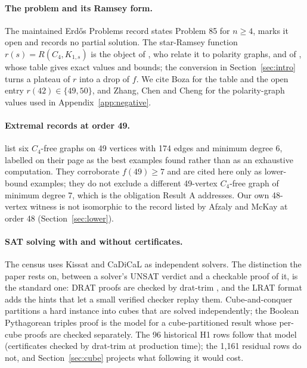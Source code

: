 \documentclass{anvil-paper}
\theoremstyle{definition}
\begin{document}
\paragraph{The problem and its Ramsey form.} The maintained Erdős Problems record \citep{bloom-erdos85} states Problem 85 for $n\ge 4$, marks it open and records no partial solution. The star-Ramsey function $r(s)=R(C_4,K_{1,s})$ is the object of \citet{zhang2017polarity}, who relate it to polarity graphs, and of \citet{boza2024ramsey}, whose table gives exact values and bounds; the conversion in Section~\ref{sec:intro} turns a plateau of $r$ into a drop of $f$. We cite Boza for the table and the open entry $r(42)\in\{49,50\}$, and Zhang, Chen and Cheng for the polarity-graph values used in Appendix~\ref{app:negative}.

\paragraph{Extremal records at order 49.} \citet{afzaly-mckay-extremal} list six $C_4$-free graphs on 49 vertices with 174 edges and minimum degree 6, labelled on their page as the best examples found rather than as an exhaustive computation. They corroborate $f(49)\ge 7$ and are cited here only as lower-bound examples; they do not exclude a different 49-vertex $C_4$-free graph of minimum degree 7, which is the obligation Result A addresses. Our own 48-vertex witness is not isomorphic to the record listed by Afzaly and McKay at order 48 (Section~\ref{sec:lower}).

\paragraph{SAT solving with and without certificates.} The census uses Kissat \citep{biere2024kissat} and CaDiCaL \citep{biere2020cadical} as independent solvers. The distinction the paper rests on, between a solver's UNSAT verdict and a checkable proof of it, is the standard one: DRAT proofs are checked by drat-trim \citep{wetzler2014drat}, and the LRAT format \citep{cruzfilipe2017lrat} adds the hints that let a small verified checker replay them. Cube-and-conquer \citep{heule2011cube} partitions a hard instance into cubes that are solved independently; the Boolean Pythagorean triples proof \citep{heule2016pythagorean} is the model for a cube-partitioned result whose per-cube proofs are checked separately. The 96 historical H1 rows follow that model (certificates checked by drat-trim at production time); the 1,161 residual rows do not, and Section~\ref{sec:cube} projects what following it would cost.
\end{document}
